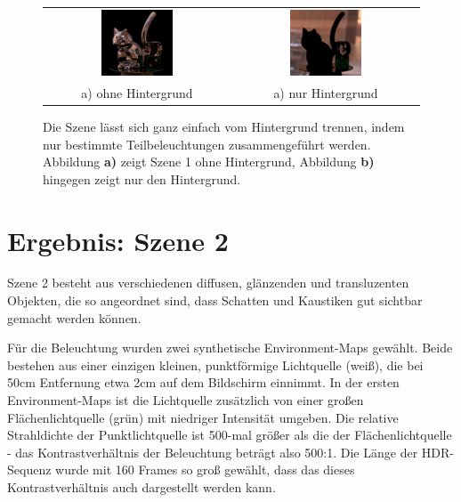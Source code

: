    \begin{figure}[h]
    \centering
    \begin{tabular}{cc}
     \includegraphics[width=0.40\textwidth]{../graphics/ergebnisse/result_reflective_extended_small.jpg}
    &
     \includegraphics[width=0.40\textwidth]{../graphics/ergebnisse/result_background_small.jpg}
    \\
    a) ohne Hintergrund & a) nur Hintergrund \\
    \end{tabular}
    \caption[Ergebnis: Szene 1 (Hintergrund) ]{ Die Szene lässt sich ganz einfach vom Hintergrund trennen, indem nur bestimmte Teilbeleuchtungen zusammengeführt werden. Abbildung \textbf{a)} zeigt Szene 1 ohne Hintergrund,  Abbildung \textbf{b)} hingegen zeigt nur den Hintergrund. }
    \label{fig:result_background}
   \end{figure}




\section {Ergebnis: Szene 2} \label{szene2}
   Szene 2 besteht aus verschiedenen diffusen, glänzenden und transluzenten Objekten, die so angeordnet sind, dass Schatten und Kaustiken gut sichtbar gemacht werden können.
   
   Für die Beleuchtung wurden zwei synthetische Environment-Maps gewählt. Beide bestehen aus einer einzigen kleinen, punktförmige Lichtquelle (weiß), die bei 50cm Entfernung etwa 2cm auf dem Bildschirm einnimmt.
   In der ersten Environment-Maps ist die Lichtquelle zusätzlich von einer großen Flächenlichtquelle (grün) mit niedriger Intensität umgeben.
   Die relative Strahldichte der Punktlichtquelle ist  500-mal größer als die der Flächenlichtquelle - das Kontrastverhältnis der Beleuchtung beträgt also 500:1.
   Die Länge der HDR-Sequenz wurde mit 160 Frames so groß gewählt, dass das dieses  Kontrastverhältnis auch dargestellt werden kann. 
   
